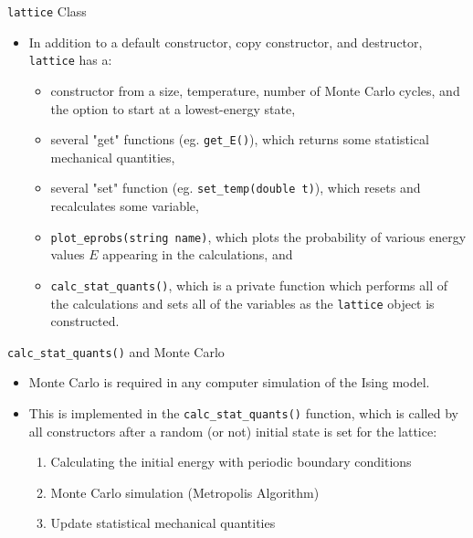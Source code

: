 \documentclass{beamer} %
\begin{document}
\begin{frame}{\texttt{lattice} Class}
\begin{itemize}
\item In addition to a default constructor, copy constructor, and  destructor, \texttt{lattice} has a:
\begin{itemize}
\item constructor from a size, temperature, number of Monte Carlo cycles, and the option to start at a lowest-energy state,
\item several "get" functions (eg. \texttt{get\_{E}()}), which returns some statistical mechanical quantities,
\item several "set" function (eg. \texttt{set\_temp(double t)}), which resets and recalculates some variable,
\item \texttt{plot\_eprobs(string name)}, which plots the probability of various energy values $E$ appearing in the calculations, and
\item \texttt{calc\_stat\_quants()}, which is a private function which performs all of the calculations and sets all of the variables as the \texttt{lattice} object is constructed.
\end{itemize} 
\end{itemize}
\end{frame}

\begin{frame}{\texttt{calc\_stat\_quants()} and Monte Carlo}
\begin{itemize}
\item Monte Carlo is required in any computer simulation of the Ising model.
\item This is implemented in the \texttt{calc\_stat\_quants()} function, which is called by all constructors after a random (or not) initial state is set for the lattice:
\begin{enumerate}
\item Calculating the initial energy with periodic boundary conditions
\item Monte Carlo simulation (Metropolis Algorithm)
\item Update statistical mechanical quantities 
\end{enumerate}
\end{itemize}
\end{frame}
\end{document}
